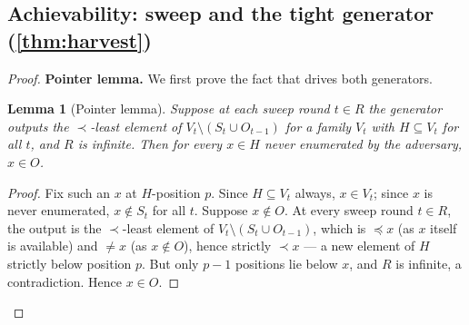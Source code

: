 \documentclass[11pt]{article}
\numberwithin{equation}{section}
\newcommand{\Val}{H}
\newcommand{\Seen}{S}
\newcommand{\Out}{O}
\theoremstyle{plain}
\newtheorem{lemma}[theorem]{Lemma}
\theoremstyle{definition}
\theoremstyle{remark}
\begin{document}
\subsection{Achievability: sweep and the tight generator (\texorpdfstring{\cref{thm:harvest}}{Theorem 5})}
\label{app:harvest}

\begin{statementbox}
\ThmHarvest*
\end{statementbox}
\begin{proof}
\medskip\noindent\textbf{Pointer lemma.}\quad
We first prove the fact that drives both generators.

\begin{lemma}[Pointer lemma]\label{lem:pointer}
Suppose at each sweep round $t \in R$ the generator outputs the $\prec$-least element of $V_t
\setminus (\Seen_t \cup \Out_{t-1})$ for a family $V_t$ with $\Val \subseteq V_t$ for all $t$,
and $R$ is infinite. Then for every $x \in \Val$ never enumerated by the adversary, $x \in
\Out$.
\end{lemma}

\begin{proof}
Fix such an $x$ at $\Val$-position $p$. Since $\Val \subseteq V_t$ always, $x \in V_t$; since
$x$ is never enumerated, $x \notin \Seen_t$ for all $t$. Suppose $x \notin \Out$. At every
sweep round $t \in R$, the output is the $\prec$-least element of $V_t \setminus (\Seen_t \cup
\Out_{t-1})$, which is $\preceq x$ (as $x$ itself is available) and $\ne x$ (as $x \notin
\Out$), hence strictly $\prec x$ --- a new element of $\Val$ strictly below position $p$. But
only $p-1$ positions lie below $x$, and $R$ is infinite, a contradiction. Hence $x \in \Out$.
\end{proof}


\end{proof}
\end{document}
